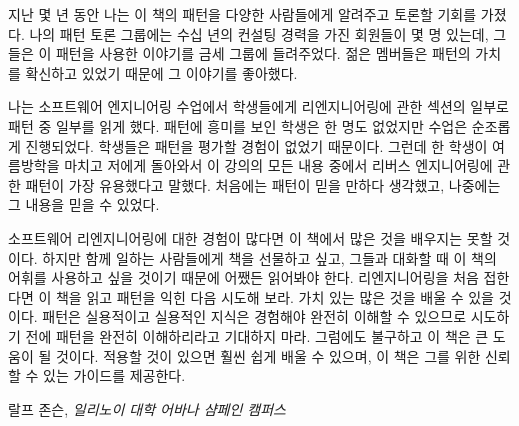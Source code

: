 \documentclass[a4paper,10pt,twoside]{book}
\begin{document}
지난 몇 년 동안 나는 이 책의 패턴을 다양한 사람들에게 알려주고 토론할 기회를 가졌다.  나의 패턴 토론 그룹에는 수십 년의 컨설팅 경력을 가진 회원들이 몇 명 있는데, 그들은 이 패턴을 사용한 이야기를 금세 그룹에 들려주었다.  젊은 멤버들은 패턴의 가치를 확신하고 있었기 때문에 그 이야기를 좋아했다.

나는 소프트웨어 엔지니어링 수업에서 학생들에게 리엔지니어링에 관한 섹션의 일부로 패턴 중 일부를 읽게 했다.  패턴에 흥미를 보인 학생은 한 명도 없었지만 수업은 순조롭게 진행되었다.  학생들은 패턴을 평가할 경험이 없었기 때문이다. 그런데 한 학생이 여름방학을 마치고 저에게 돌아와서 이 강의의 모든 내용 중에서 리버스 엔지니어링에 관한 패턴이 가장 유용했다고 말했다.  처음에는 패턴이 믿을 만하다 생각했고, 나중에는 그 내용을 믿을 수 있었다.

소프트웨어 리엔지니어링에 대한 경험이 많다면 이 책에서 많은 것을 배우지는 못할 것이다.  하지만 함께 일하는 사람들에게 책을 선물하고 싶고, 그들과 대화할 때 이 책의 어휘를 사용하고 싶을 것이기 때문에 어쨌든 읽어봐야 한다.  리엔지니어링을 처음 접한다면 이 책을 읽고 패턴을 익힌 다음 시도해 보라.  가치 있는 많은 것을 배울 수 있을 것이다.  패턴은 실용적이고 실용적인 지식은 경험해야 완전히 이해할 수 있으므로 시도하기 전에 패턴을 완전히 이해하리라고 기대하지 마라.  그럼에도 불구하고 이 책은 큰 도움이 될 것이다.  적용할 것이 있으면 훨씬 쉽게 배울 수 있으며, 이 책은 그를 위한 신뢰할 수 있는 가이드를 제공한다.

\hfill 랄프 존슨, \emph{일리노이 대학 어바나 샴페인 캠퍼스}

\vfill

\ifx\wholebook\relax\else
   
   
   
\end{document}
